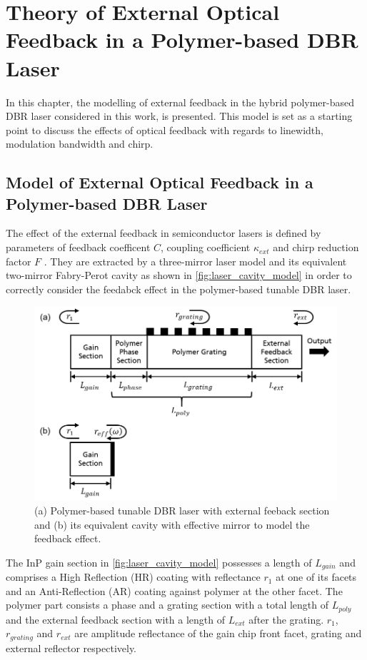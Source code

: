\chapter{Theory of External Optical Feedback in a Polymer-based DBR Laser}\label{ch:Theory}
In this chapter, the modelling of external feedback in the hybrid polymer-based DBR laser considered in this work, is presented. This model is set as a starting point to discuss the effects of optical feedback with regards to linewidth, modulation bandwidth and chirp.

\section{Model of External Optical Feedback in a Polymer-based DBR Laser}\label{sec:model_laser}
The effect of the external feedback in semiconductor lasers is defined by parameters of feedback coefficent $C$, coupling coefficient $\kappa_{ext}$ and chirp reduction factor $F$ \cite{kazarinov1987relation, petermann2012laser}. They are extracted by a three-mirror laser model and its equivalent two-mirror Fabry-Perot cavity as shown in \autoref{fig:laser_cavity_model} in order to correctly consider the feedabck effect in the polymer-based tunable DBR laser.

\begin{figure}[ht]
    \centering
    \includegraphics[width=.9\linewidth]{figures/laser_cavity_model.png}
    \caption{(a) Polymer-based tunable DBR laser with external feeback section and (b) its equivalent cavity with effective mirror to model the feedback effect.}
    \label{fig:laser_cavity_model}
\end{figure}

The InP gain section in \autoref{fig:laser_cavity_model} possesses a length of $L_{gain}$ and comprises a High Reflection (HR) coating with reflectance $r_1$ at one of its facets and an Anti-Reflection (AR) coating against polymer at the other facet. The polymer part consists a phase and a grating section with a total length of $L_{poly}$ and the external feedback section with a length of $L_{ext}$ after the grating. $r_1$, $r_{grating}$ and $r_{ext}$ are amplitude reflectance of the gain chip front facet, grating and external reflector respectively.

